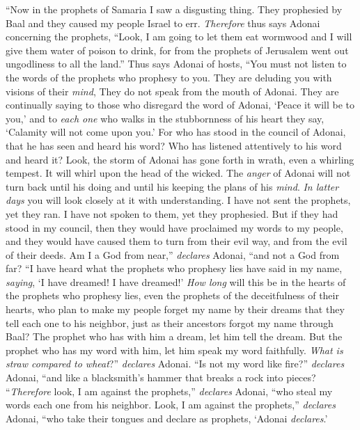\begin{biblechapter}
\verse “Now in the prophets of Samaria I saw a disgusting thing. 
They prophesied by Baal and they caused my people Israel to err.
\verse \textit{Therefore} thus says Adonai concerning the prophets, “Look, I am going to let them eat wormwood 
and I will give them water of poison to drink, 
for from the prophets of Jerusalem 
went out ungodliness to all the land.”
\verse Thus says Adonai of hosts,
\verse “You must not listen to the words of the prophets who prophesy to you. 
They are deluding you with visions of their \textit{mind}, 
They do not speak from the mouth of Adonai.
\verse They are continually saying to those who disregard the word of Adonai, 
‘Peace it will be to you,’ 
and to \textit{each one} who walks in the stubbornness of his heart they say, 
‘Calamity will not come upon you.’
\verse For who has stood in the council of Adonai, 
that he has seen and heard his word? 
Who has listened attentively to his word 
and heard it?
\verse Look, the storm of Adonai has gone forth in wrath, 
even a whirling tempest. 
It will whirl upon the head of the wicked.
\verse The \textit{anger} of Adonai will not turn back 
until his doing and until his keeping the plans of his \textit{mind}. 
\textit{In latter days} you will look closely at it with understanding.
\verse I have not sent the prophets, yet they ran. 
I have not spoken to them, yet they prophesied.
\verse But if they had stood in my council, 
then they would have proclaimed my words to my people, 
and they would have caused them to turn from their evil way, 
and from the evil of their deeds.
\verse Am I a God from near,” \textit{declares} Adonai, 
“and not a God from far?
\verse “I have heard what the prophets who prophesy lies have said in my name, \textit{saying}, ‘I have dreamed! I have dreamed!’
\verse \textit{How long} will this be in the hearts of the prophets who prophesy lies, even the prophets of the deceitfulness of their hearts,
\verse who plan to make my people forget my name by their dreams that they tell each one to his neighbor, just as their ancestors forgot my name through Baal?
\verse The prophet who has with him a dream, let him tell the dream. But the prophet who has my word with him, let him speak my word faithfully. \textit{What is straw compared to wheat}?” \textit{declares} Adonai.
\verse “Is not my word like fire?” \textit{declares} Adonai, “and like a blacksmith’s hammer that breaks a rock into pieces?
\verse “\textit{Therefore} look, I am against the prophets,” \textit{declares} Adonai, “who steal my words each one from his neighbor.
\verse Look, I am against the prophets,” \textit{declares} Adonai, “who take their tongues and declare as prophets, ‘Adonai \textit{declares}.’

\end{biblechapter}
